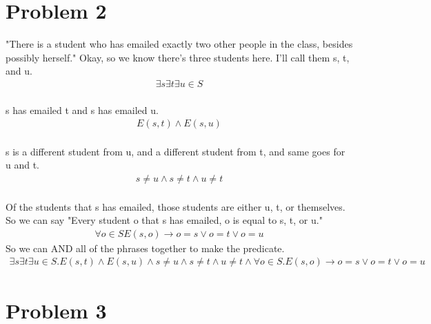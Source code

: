 \documentclass{article}
\begin{document}
\section{Problem 2}
"There is a student who has emailed exactly two other people in the class, besides possibly herself."
Okay, so we know there's three students here. I'll call them s, t, and u. 
\\
\begin {align*}
\exists s \exists t \exists u \in S 
\end {align*}
\\
s has emailed t and s has emailed u.
\\
\begin {align*}
E(s,t) \wedge E(s,u)
\end {align*}
\\
s is a different student from u, and a different student from t, and same goes for u and t. 
\\
\begin {align*}
s \neq u \wedge s \neq t \wedge u \neq t
\end {align*}
\\
Of the students that s has emailed, those students are either u, t, or themselves. So we can say "Every student o that s has emailed, o is equal to s, t, or u."
\begin {align*}
\forall o \in S E(s, o) \rightarrow o = s \vee o = t \vee o = u
\end {align*}
So we can AND all of the phrases together to make the predicate. 
\begin {align*}
\exists s \exists t \exists u \in S. E(s,t) \wedge E(s,u) \wedge s \neq u \wedge s \neq t \wedge u \neq t \wedge \forall o \in S. E(s, o) \rightarrow o = s \vee o = t \vee o = u
\end {align*}

\section{Problem 3}
\end{document}

